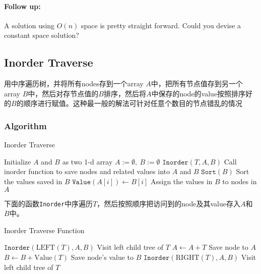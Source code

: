 \paragraph{Follow up:}
\begin{flushleft}
A solution using $O(n)$ space is pretty straight forward. Could you devise a constant space solution?
\end{flushleft}
\subsection{Inorder Traverse}
\begin{CJK*}{UTF8}{gbsn}
用中序遍历树，并将所有nodes存到一个array $A$中，把所有节点值存到另一个array $B$中，然后对存节点值的$B$排序，然后将$A$中保存的node的value按照排序好的$B$的顺序进行赋值。这种最一般的解法可针对任意个数目的节点错乱的情况
\end{CJK*}
\subsubsection{Algorithm}
\setcounter{algorithm}{0}
\begin{algorithm}[H]
\caption{Inorder Traverse}
\begin{algorithmic}[1]
\State Initialize $A$ and $B$ as two 1-d array
\State $A:=\emptyset,\ B:=\emptyset$
\State $\texttt{Inorder}(T, A, B)$ \Comment Call inorder function to save nodes and related values into $A$ and $B$
\State $\texttt{Sort}(B)$ \Comment Sort the values saved in $B$
\State $\texttt{Value}(A[i])\gets B[i]$ \Comment Assign the values in $B$ to nodes in $A$
\EndFor
\EndProcedure
\end{algorithmic}
\end{algorithm}
\begin{CJK*}{UTF8}{gbsn}
下面的函数\texttt{Inorder}中序遍历$T$，然后按照顺序把访问到的node及其value存入$A$和$B$中。
\end{CJK*}
\begin{algorithm}[H]
\caption{Inorder Traverse Function}
\begin{algorithmic}[1]
\State \Return
\EndIf
{}
\end{algorithmic}
\end{algorithm}
\begin{algorithm}[H]
\begin{algorithmic}[1]
\State $\texttt{Inorder}(\text{LEFT}(T), A, B)$ \Comment Visit left child tree of $T$
\State $A\gets A + T$ \Comment Save node to $A$
\State $B\gets B + \text{Value}(T)$ \Comment Save node's value to $B$
\State  $\texttt{Inorder}(\text{RIGHT}(T), A, B)$ \Comment Visit left child tree of $T$
\EndFunction
\end{algorithmic}
\end{algorithm}
